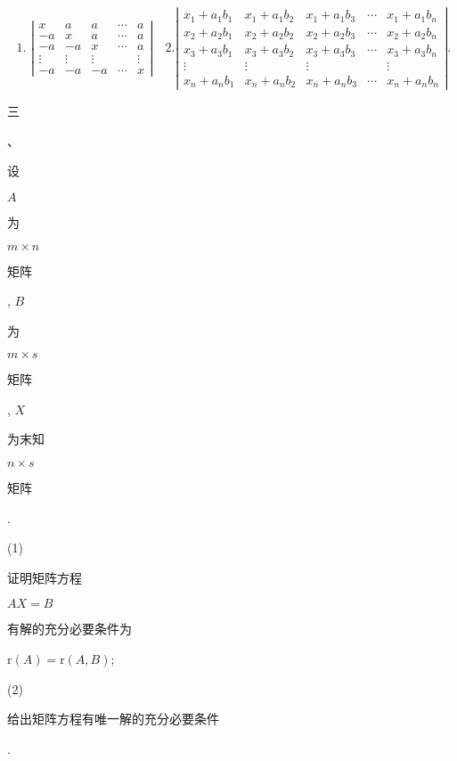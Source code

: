 \documentclass[10pt]{article}
\begin{document}
$$
\text { 1. }\left|\begin{array}{ccccc}
x & a & a & \cdots & a \\
-a & x & a & \cdots & a \\
-a & -a & x & \cdots & a \\
\vdots & \vdots & \vdots & & \vdots \\
-a & -a & -a & \cdots & x
\end{array}\right| \quad 2 .\left|\begin{array}{ccccc}
x_{1}+a_{1} b_{1} & x_{1}+a_{1} b_{2} & x_{1}+a_{1} b_{3} & \cdots & x_{1}+a_{1} b_{n} \\
x_{2}+a_{2} b_{1} & x_{2}+a_{2} b_{2} & x_{2}+a_{2} b_{3} & \cdots & x_{2}+a_{2} b_{n} \\
x_{3}+a_{3} b_{1} & x_{3}+a_{3} b_{2} & x_{3}+a_{3} b_{3} & \cdots & x_{3}+a_{3} b_{n} \\
\vdots & \vdots & \vdots & & \vdots \\
x_{n}+a_{n} b_{1} & x_{n}+a_{n} b_{2} & x_{n}+a_{n} b_{3} & \cdots & x_{n}+a_{n} b_{n}
\end{array}\right| .
$$
\begin{CJK}{UTF8}{mj}三\end{CJK}、\begin{CJK}{UTF8}{mj}设\end{CJK} $A$ \begin{CJK}{UTF8}{mj}为\end{CJK} $m \times n$ \begin{CJK}{UTF8}{mj}矩阵\end{CJK}, $B$ \begin{CJK}{UTF8}{mj}为\end{CJK} $m \times s$ \begin{CJK}{UTF8}{mj}矩阵\end{CJK}, $X$ \begin{CJK}{UTF8}{mj}为末知\end{CJK} $n \times s$ \begin{CJK}{UTF8}{mj}矩阵\end{CJK}.

(1) \begin{CJK}{UTF8}{mj}证明矩阵方程\end{CJK} $A X=B$ \begin{CJK}{UTF8}{mj}有解的充分必要条件为\end{CJK} $\mathrm{r}(A)=\mathrm{r}(A, B)$;

(2) \begin{CJK}{UTF8}{mj}给出矩阵方程有唯一解的充分必要条件\end{CJK}.
\end{document}
